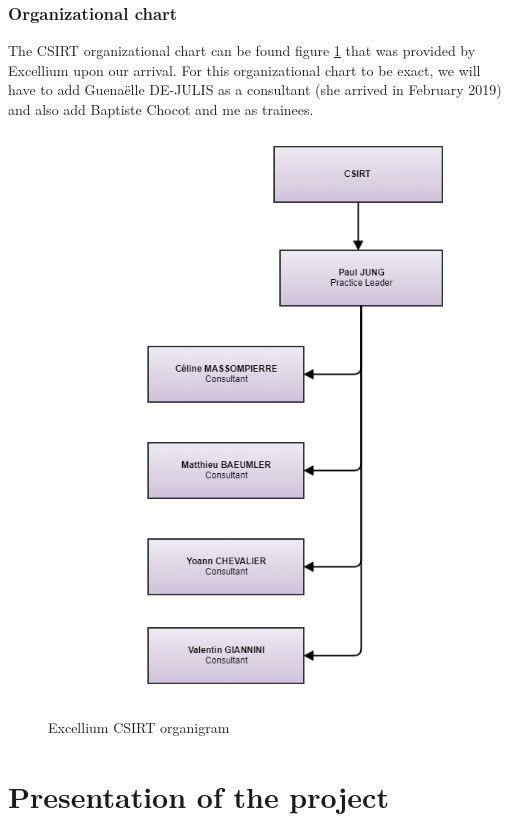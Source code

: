 \documentclass{tnreport}
\begin{document}
\subsection{Organizational chart}
The \gls{CSIRT} organizational chart can be found figure \ref{organigram} that was provided by \gls{Excellium} upon our arrival. For this organizational chart to be exact, we will have to add Guenaëlle DE-JULIS as a consultant (she arrived in February 2019) and also add Baptiste Chocot and me as trainees.
\begin{figure}[h!]
  \begin{center}
  \includegraphics[scale=0.9]{figures/CSIRT_organigram}
  \caption{\gls{Excellium} \gls{CSIRT} organigram}
  \label{organigram}
  \end{center}
\end{figure}

\cleardoublepage

\chapter{Presentation of the project}
\end{document}
